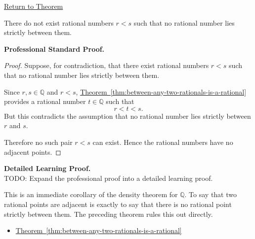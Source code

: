 \newpage
{}
\label{prf:q-has-no-adjacent-points}

\begin{remark*}[Return]
\hyperref[cor:q-has-no-adjacent-points]{Return to Theorem}
\end{remark*}

\begin{theorem*}
There do not exist rational numbers $r<s$ such that no rational number lies
strictly between them.
\end{theorem*}

\textbf{Professional Standard Proof.}~\\
\begin{proof}
Suppose, for contradiction, that there exist rational numbers $r<s$ such that
no rational number lies strictly between them.

Since $r,s\in\mathbb{Q}$ and $r<s$,
\hyperref[thm:between-any-two-rationals-is-a-rational]{Theorem~\ref*{thm:between-any-two-rationals-is-a-rational}}
provides a rational number $t\in\mathbb{Q}$ such that
\[
r<t<s.
\]
But this contradicts the assumption that no rational number lies strictly
between $r$ and $s$.

Therefore no such pair $r<s$ can exist. Hence the rational numbers have no
adjacent points.
\end{proof}

\textbf{Detailed Learning Proof.}~\\
TODO: Expand the professional proof into a detailed learning proof.


\begin{remark*}
This is an immediate corollary of the density theorem for $\mathbb{Q}$. To say
that two rational points are adjacent is exactly to say that there is no
rational point strictly between them. The preceding theorem rules this out
directly.
\end{remark*}

\begin{dependencies}
\begin{itemize}
  \item \hyperref[thm:between-any-two-rationals-is-a-rational]{Theorem~\ref*{thm:between-any-two-rationals-is-a-rational}}
\end{itemize}
\end{dependencies}

